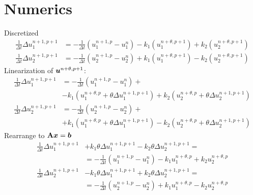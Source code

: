 \documentclass{mooiman_memo}
\newcommand{\Dt}{\Delta t}
\renewcommand{\vec}[1]{\mbox{\boldmath $#1$} }
\newcommand{\mat}[1]{\mbox{\boldmath ${\rm #1}$} }
\begin{document}
\section{Numerics}
Discretized
\begin{align}
    \frac{1}{\Dt}\Delta u_1^{n+1, p+1} & = - \frac{1}{\Dt}(u_1^{n+1,p} - u_1^n) - k_1 (u_1^{n+\theta,p+1}) + k_2 (u_2^{n+\theta,p+1})
    \\
    \frac{1}{\Dt}\Delta u_2^{n+1, p+1} & = - \frac{1}{\Dt}(u_2^{n+1,p} - u_2^n) + k_1(u_1^{n+\theta,p+1}) - k_2 (u_2^{n+\theta,p+1})
\end{align}
Linearization of $\vec{u}^{n+\theta,p+1}$:
\begin{align}
    \frac{1}{\Dt}\Delta u_1^{n+1, p+1} & =
    - \frac{1}{\Dt}(u_1^{n+1,p} - u_1^n) + \\
    & - k_1 (u_1^{n+\theta,p} + \theta \Delta u_1^{n+1, p+1})
      + k_2 (u_2^{n+\theta,p} + \theta \Delta u_2^{n+1, p+1})
    \\
    \frac{1}{\Dt}\Delta u_2^{n+1, p+1} & = - \frac{1}{\Dt}(u_2^{n+1,p} - u_2^n) +
    \\
    & + k_1 (u_1^{n+\theta,p} + \theta \Delta u_1^{n+1, p+1})
      - k_2 (u_2^{n+\theta,p} + \theta \Delta u_2^{n+1, p+1})
\end{align}
Rearrange to $\mat{A}\vec{x}=\vec{b}$
\begin{align}
    \frac{1}{\Dt}\Delta u_1^{n+1, p+1} & + k_1 \theta \Delta u_1^{n+1, p+1} - k_2 \theta \Delta u_2^{n+1, p+1} =
    \\
& = - \frac{1}{\Dt}(u_1^{n+1,p} - u_1^n) - k_1 u_1^{n+\theta,p} + k_2 u_2^{n+\theta,p}
\\
\frac{1}{\Dt}\Delta u_2^{n+1, p+1} & - k_1 \theta \Delta u_1^{n+1, p+1} + k_2 \theta \Delta u_2^{n+1, p+1} = \\
& =- \frac{1}{\Dt}(u_2^{n+1,p} - u_2^n) + k_1 u_1^{n+\theta,p}
- k_2 u_2^{n+\theta,p}
\end{align}
%
%
\end{document}
